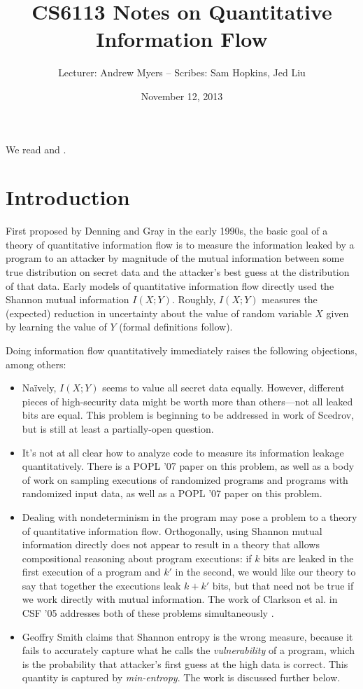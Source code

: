 \documentclass[10pt]{amsart}
\title{CS6113 Notes on Quantitative Information Flow}
\author{Lecturer: Andrew Myers -- Scribes: Sam Hopkins, Jed Liu}
\date{November 12, 2013}                                           %
\begin{document}
\maketitle

We read \cite{smith} and \cite{clarkson_etal}.

\section{Introduction}
First proposed by Denning and Gray in the early 1990s, the basic goal of a
theory of quantitative information flow is to measure the information leaked by
a program to an attacker by magnitude of the mutual information between some
true distribution on secret data and the attacker's best guess at the
distribution of that data. Early models of quantitative information flow
directly used the Shannon mutual information $I(X ; Y)$. Roughly, $I(X ; Y)$
measures the (expected) reduction in uncertainty about the value of random
variable $X$ given by learning the value of $Y$ (formal definitions follow).

Doing information flow quantitatively immediately raises the following
objections, among others:

\begin{itemize}
  \item Na\"ively, $I(X;Y)$ seems to value all secret data equally. However,
    different pieces of high-security data might be worth more than
    others---not all leaked bits are equal. This problem is beginning to be
    addressed in work of Scedrov, but is still at least a partially-open
    question.
  \item It's not at all clear how to analyze code to measure its information
    leakage quantitatively. There is a POPL '07 paper on this problem, as well
    as a body of work on sampling executions of randomized programs and
    programs with randomized input data, as well as a POPL '07 paper on this
    problem.
  \item Dealing with nondeterminism in the program may pose a problem to a
    theory of quantitative information flow. Orthogonally, using Shannon mutual
    information directly does not appear to result in a theory that allows
    compositional reasoning about program executions: if $k$ bits are leaked in
    the first execution of a program and $k'$ in the second, we would like our
    theory to say that together the executions leak $k + k'$ bits, but that
    need not be true if we work directly with mutual information. The work of
    Clarkson et al. in CSF '05 addresses both of these problems simultaneously
    \cite{clarkson_etal}.
  \item Geoffry Smith claims that Shannon entropy is the wrong measure, because
    it fails to accurately capture what he calls the \emph{vulnerability} of a
    program, which is the probability that attacker's first guess at the high
    data is correct. This quantity is captured by \emph{min-entropy}. The work
    is discussed further below.
\end{itemize}
\end{document}
